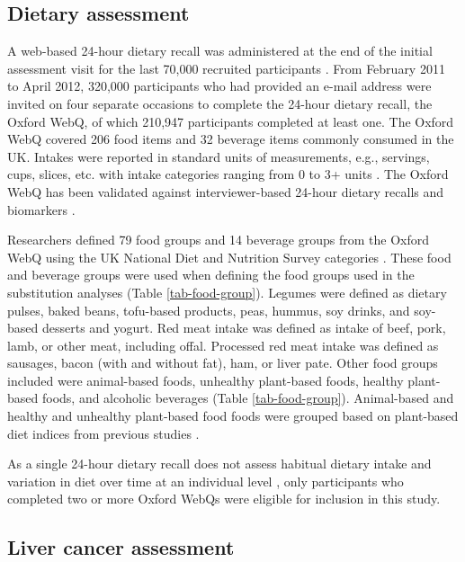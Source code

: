 \documentclass[nutrients,article,submit,moreauthors,pdftex]{Definitions/mdpi}
\begin{document}
\hypertarget{subsec2}{%
\subsection{Dietary assessment}\label{subsec2}}

A web-based 24-hour dietary recall was administered at the end of the
initial assessment visit for the last 70,000 recruited participants
\citep{RN115}. From February 2011 to April 2012, 320,000 participants
who had provided an e-mail address were invited on four separate
occasions to complete the 24-hour dietary recall, the Oxford WebQ, of
which 210,947 participants completed at least one. The Oxford WebQ
covered 206 food items and 32 beverage items commonly consumed in the
UK. Intakes were reported in standard units of measurements, e.g.,
servings, cups, slices, etc. with intake categories ranging from 0 to 3+
units \citep{piernas2021}. The Oxford WebQ has been validated against
interviewer-based 24-hour dietary recalls and biomarkers
\citep{Liu2011, Greenwood2019}.

Researchers defined 79 food groups and 14 beverage groups from the
Oxford WebQ using the UK National Diet and Nutrition Survey categories
\citep{piernas2021}. These food and beverage groups were used when
defining the food groups used in the substitution analyses (Table
\ref{tab-food-group}). Legumes were defined as dietary pulses, baked
beans, tofu-based products, peas, hummus, soy drinks, and soy-based
desserts and yogurt. Red meat intake was defined as intake of beef,
pork, lamb, or other meat, including offal. Processed red meat intake
was defined as sausages, bacon (with and without fat), ham, or liver
pate. Other food groups included were animal-based foods, unhealthy
plant-based foods, healthy plant-based foods, and alcoholic beverages
(Table \ref{tab-food-group}). Animal-based and healthy and unhealthy
plant-based food foods were grouped based on plant-based diet indices
from previous studies
\citep{Thompson2023, Heianza2021, Satija2017, Satija2016}.

As a single 24-hour dietary recall does not assess habitual dietary
intake and variation in diet over time at an individual level
\citep{thompson2013, gurinovic2017}, only participants who completed two
or more Oxford WebQs were eligible for inclusion in this study.

\hypertarget{subsec3}{%
\subsection{Liver cancer assessment}\label{subsec3}}
\end{document}
